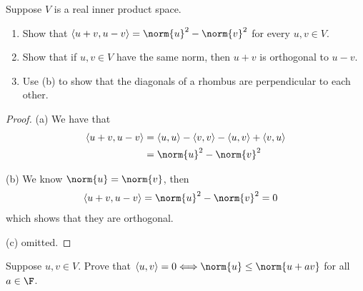 \documentclass{extarticle}
\begin{document}
\begin{problem}{5}
    Suppose \(V\) is a real inner product space.
    \begin{enumerate}[label=(\alph*)]
        \item Show that \(\langle u+v,u-v \rangle = \norm{u}^2 - \norm{v}^2\) for every \(u, v \in V\).
        \item Show that if \(u, v \in V\) have the same norm, then \(u + v\) is orthogonal to \(u - v\).
        \item Use (b) to show that the diagonals of a rhombus are perpendicular to each other.
    \end{enumerate}
\end{problem}

\begin{proof}
(a) We have that
\begin{align*}
    \langle u + v,u - v \rangle
    &= \langle u,u \rangle - \langle v,v \rangle - \langle u,v \rangle + \langle v,u \rangle \\
    &= \norm{u}^2 - \norm{v}^2
\end{align*}

(b) We know \(\norm{u} = \norm{v}\), then
\begin{align*}
    \langle u+v,u-v \rangle
    &= \norm{u}^2 - \norm{v}^2 = 0
\end{align*}
which shows that they are orthogonal.

(c) omitted.
\end{proof}

\begin{problem}{6}
    Suppose \(u, v \in V\). Prove that \(\langle u,v \rangle = 0 \Longleftrightarrow \norm{u} \leq \norm{u
    + av}\) for all \(a \in \F\).
\end{problem}
\end{document}
